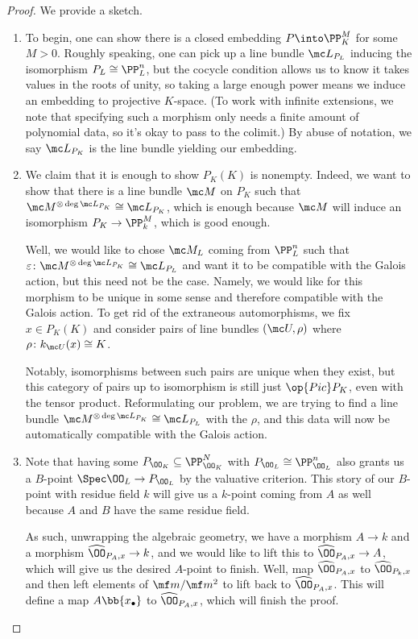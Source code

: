 \documentclass[../notes.tex]{subfiles}
\begin{document}
\begin{proof}
	We provide a sketch.
	\begin{enumerate}
		\item To begin, one can show there is a closed embedding $P\into\PP^M_K$ for some $M>0$. Roughly speaking, one can pick up a line bundle $\mc L_{P_L}$ inducing the isomorphism $P_L\cong\PP^n_L$, but the cocycle condition allows us to know it takes values in the roots of unity, so taking a large enough power means we induce an embedding to projective $K$-space. (To work with infinite extensions, we note that specifying such a morphism only needs a finite amount of polynomial data, so it's okay to pass to the colimit.) By abuse of notation, we say $\mc L_{P_K}$ is the line bundle yielding our embedding.
		\item We claim that it is enough to show $P_K(K)$ is nonempty. Indeed, we want to show that there is a line bundle $\mc M$ on $P_K$ such that $\mc M^{\otimes\deg\mc L_{P_K}}\cong\mc L_{P_K}$, which is enough because $\mc M$ will induce an isomorphism $P_K\to\PP^M_k$, which is good enough.

		Well, we would like to chose $\mc M_L$ coming from $\PP^n_L$ such that $\varepsilon\colon\mc M^{\otimes\deg\mc L_{P_K}}\cong\mc L_{P_L}$ and want it to be compatible with the Galois action, but this need not be the case. Namely, we would like for this morphism to be unique in some sense and therefore compatible with the Galois action. To get rid of the extraneous automorphisms, we fix $x\in P_K(K)$ and consider pairs of line bundles $(\mc U,\rho)$ where $\rho\colon k_{\mc U}(x)\cong K$.

		Notably, isomorphisms between such pairs are unique when they exist, but this category of pairs up to isomorphism is still just $\op{Pic}P_K$, even with the tensor product. Reformulating our problem, we are trying to find a line bundle $\mc M^{\otimes\deg\mc L_{P_K}}\cong\mc L_{P_L}$ with the $\rho$, and this data will now be automatically compatible with the Galois action.
		\item Note that having some $P_{\OO_K}\subseteq\PP^N_{\OO_K}$ with $P_{\OO_L}\cong\PP^n_{\OO_L}$ also grants us a $B$-point $\Spec\OO_L\to P_{\OO_L}$ by the valuative criterion. This story of our $B$-point with residue field $k$ will give us a $k$-point coming from $A$ as well because $A$ and $B$ have the same residue field.

		As such, unwrapping the algebraic geometry, we have a morphism $A\to k$ and a morphism $\widehat\OO_{P_A,x}\to k$, and we would like to lift this to $\widehat\OO_{P_A,x}\to A$, which will give us the desired $A$-point to finish. Well, map $\widehat\OO_{P_A,x}$ to $\widehat\OO_{P_k,x}$ and then left elements of $\mf m/\mf m^2$ to lift back to $\widehat\OO_{P_A,x}$. This will define a map $A\bb{x_\bullet}$ to $\widehat\OO_{P_A,x}$, which will finish the proof.
		\qedhere
	\end{enumerate}
\end{proof}
\end{document}
